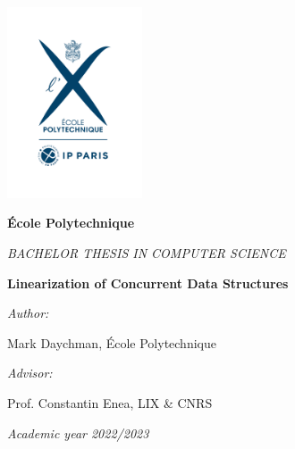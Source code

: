 \documentclass[oneside, a4paper, onecolumn, 10pt]{article}
\newcommand{\thesistitle}[0]{Linearization of Concurrent Data Structures}
\newcommand{\authorname}[0]{Mark Daychman}
\newcommand{\supervisor}[0]{Prof. Constantin Enea}
\newcommand{\supervisorinstitution}[0]{LIX \& CNRS}
\begin{document}



\hspace{0pt}
\vfill

\begin{center}

\includegraphics[width=0.3\textwidth]{logo-EP-vertical}

\vspace*{2em}
%
{\large
\textbf{\'Ecole Polytechnique}

\vspace*{1em}
\textit{BACHELOR THESIS IN COMPUTER SCIENCE}


\vspace*{3em}
{\Huge \textbf{\thesistitle}}
\vspace*{3em}



\textit{Author:}

\vspace*{1em}
\authorname{}, \'Ecole Polytechnique

\vspace*{2em}
%
{\textit{Advisor:}}

\vspace*{1em}
\supervisor{}, \supervisorinstitution{}
}

\vspace*{2em}
\textit{Academic year 2022/2023}

\end{center}

\vfill
\hspace{0pt}
\end{document}

